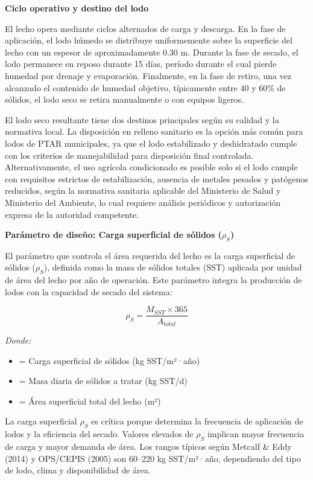 \documentclass[12pt,a4paper]{article}
\newcommand{\captionequation}[1]{}  %
\begin{document}
\textbf{Ciclo operativo y destino del lodo}

El lecho opera mediante ciclos alternados de carga y descarga. En la fase de aplicación, el lodo húmedo se distribuye uniformemente sobre la superficie del lecho con un espesor de aproximadamente 0.30 m. Durante la fase de secado, el lodo permanece en reposo durante 15 días, período durante el cual pierde humedad por drenaje y evaporación. Finalmente, en la fase de retiro, una vez alcanzado el contenido de humedad objetivo, típicamente entre 40 y 60\% de sólidos, el lodo seco se retira manualmente o con equipos ligeros.

El lodo seco resultante tiene dos destinos principales según su calidad y la normativa local. La disposición en relleno sanitario es la opción más común para lodos de PTAR municipales, ya que el lodo estabilizado y deshidratado cumple con los criterios de manejabilidad para disposición final controlada. Alternativamente, el uso agrícola condicionado es posible solo si el lodo cumple con requisitos estrictos de estabilización, ausencia de metales pesados y patógenos reducidos, según la normativa sanitaria aplicable del Ministerio de Salud y Ministerio del Ambiente, lo cual requiere análisis periódicos y autorización expresa de la autoridad competente.

\textbf{Parámetro de diseño: Carga superficial de sólidos ($\rho_S$)}

El parámetro que controla el área requerida del lecho es la carga superficial de sólidos ($\rho_S$), definida como la masa de sólidos totales (SST) aplicada por unidad de área del lecho por año de operación. Este parámetro integra la producción de lodos con la capacidad de secado del sistema:

\begin{equation}
\rho_S = \frac{M_{SST} \times 365}{A_{total}}
\end{equation}
\captionequation{Carga superficial de solidos -- parametro de control del area}

\textit{Donde:}
\begin{itemize}[noitemsep,leftmargin=2em]
    \item[$\rho_S$] = Carga superficial de sólidos (kg SST/m²·año)
    \item[$M_{SST}$] = Masa diaria de sólidos a tratar (kg SST/d)
    \item[$A_{total}$] = Área superficial total del lecho (m²)
\end{itemize}

La carga superficial $\rho_S$ es crítica porque determina la frecuencia de aplicación de lodos y la eficiencia del secado. Valores elevados de $\rho_S$ implican mayor frecuencia de carga y mayor demanda de área. Los rangos típicos según Metcalf \& Eddy (2014) y OPS/CEPIS (2005) son 60--220 kg SST/m²·año, dependiendo del tipo de lodo, clima y disponibilidad de área.
\end{document}
